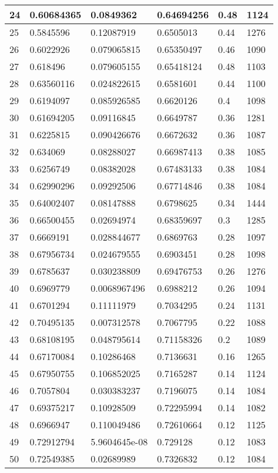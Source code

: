 \begin{longtable}{|l|l|l|l|l|l|}
24 & 0.60684365 & 0.0849362 & 0.64694256 & 0.48 & 1124 \\ \hline 
25 & 0.5845596 & 0.12087919 & 0.6505013 & 0.44 & 1276 \\ \hline 
26 & 0.6022926 & 0.079065815 & 0.65350497 & 0.46 & 1090 \\ \hline 
27 & 0.618496 & 0.079605155 & 0.65418124 & 0.48 & 1103 \\ \hline 
28 & 0.63560116 & 0.024822615 & 0.6581601 & 0.44 & 1100 \\ \hline 
29 & 0.6194097 & 0.085926585 & 0.6620126 & 0.4 & 1098 \\ \hline 
30 & 0.61694205 & 0.09116845 & 0.6649787 & 0.36 & 1281 \\ \hline 
31 & 0.6225815 & 0.090426676 & 0.6672632 & 0.36 & 1087 \\ \hline 
32 & 0.634069 & 0.08288027 & 0.66987413 & 0.38 & 1085 \\ \hline 
33 & 0.6256749 & 0.08382028 & 0.67483133 & 0.38 & 1084 \\ \hline 
34 & 0.62990296 & 0.09292506 & 0.67714846 & 0.38 & 1084 \\ \hline 
35 & 0.64002407 & 0.08147888 & 0.6798625 & 0.34 & 1444 \\ \hline 
36 & 0.66500455 & 0.02694974 & 0.68359697 & 0.3 & 1285 \\ \hline 
37 & 0.6669191 & 0.028844677 & 0.6869763 & 0.28 & 1097 \\ \hline 
38 & 0.67956734 & 0.024679555 & 0.6903451 & 0.28 & 1098 \\ \hline 
39 & 0.6785637 & 0.030238809 & 0.69476753 & 0.26 & 1276 \\ \hline 
40 & 0.6969779 & 0.0068967496 & 0.6988212 & 0.26 & 1094 \\ \hline 
41 & 0.6701294 & 0.11111979 & 0.7034295 & 0.24 & 1131 \\ \hline 
42 & 0.70495135 & 0.007312578 & 0.7067795 & 0.22 & 1088 \\ \hline 
43 & 0.68108195 & 0.048795614 & 0.71158326 & 0.2 & 1089 \\ \hline 
44 & 0.67170084 & 0.10286468 & 0.7136631 & 0.16 & 1265 \\ \hline 
45 & 0.67950755 & 0.106852025 & 0.7165287 & 0.14 & 1124 \\ \hline 
46 & 0.7057804 & 0.030383237 & 0.7196075 & 0.14 & 1084 \\ \hline 
47 & 0.69375217 & 0.10928509 & 0.72295994 & 0.14 & 1082 \\ \hline 
48 & 0.6966947 & 0.110049486 & 0.72610664 & 0.12 & 1125 \\ \hline 
49 & 0.72912794 & 5.9604645e-08 & 0.729128 & 0.12 & 1083 \\ \hline 
50 & 0.72549385 & 0.02689989 & 0.7326832 & 0.12 & 1084 \\ \hline 
\end{longtable}